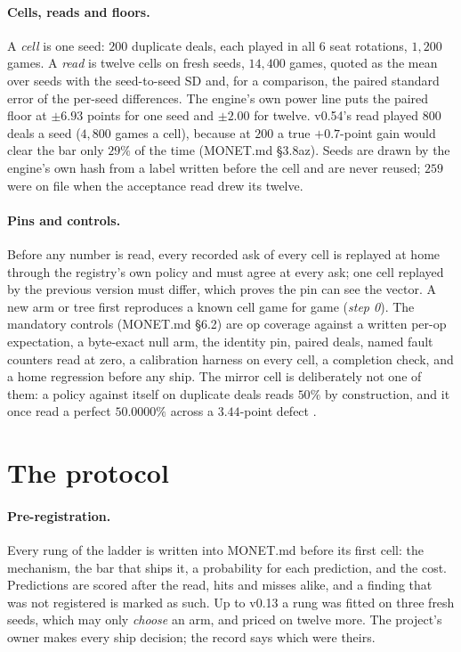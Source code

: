 \documentclass[11pt]{article}
\newcommand{\monet}{MONET.md}
\newcommand{\sect}[1]{\S#1}
\begin{document}
\paragraph{Cells, reads and floors.} A \emph{cell} is one seed: $200$ duplicate deals, each played in
all $6$ seat rotations, $1{,}200$ games. A \emph{read} is twelve cells on fresh seeds, $14{,}400$ games,
quoted as the mean over seeds with the seed-to-seed SD and, for a comparison, the paired standard error
of the per-seed differences. The engine's own power line puts the paired floor at $\pm 6.93$ points for
one seed and $\pm 2.00$ for twelve. v0.54's read played $800$ deals a seed ($4{,}800$ games a cell),
because at $200$ a true $+0.7$-point gain would clear the bar only $29\%$ of the time (\monet{}
\sect{3.8az}). Seeds are drawn by the engine's own hash from a label written before the cell and are
never reused; $259$ were on file when the acceptance read drew its twelve.

\paragraph{Pins and controls.} Before any number is read, every recorded ask of every cell is replayed
at home through the registry's own policy and must agree at every ask; one cell replayed by the previous
version must differ, which proves the pin can see the vector. A new arm or tree first reproduces a known
cell game for game (\emph{step 0}). The mandatory controls (\monet{} \sect{6.2}) are op coverage
against a written per-op expectation, a byte-exact null arm, the identity pin, paired deals, named
fault counters read at zero, a calibration harness on every cell, a completion check, and a home
regression before any ship. The mirror cell is deliberately not one of them: a policy against itself on
duplicate deals reads $50\%$ by construction, and it once read a perfect $50.0000\%$ across a
$3.44$-point defect \cite{frontier}.

\section{The protocol}
\label{sec:protocol}

\paragraph{Pre-registration.} Every rung of the ladder is written into \monet{} before its first cell:
the mechanism, the bar that ships it, a probability for each prediction, and the cost. Predictions are
scored after the read, hits and misses alike, and a finding that was not registered is marked as such.
Up to v0.13 a rung was fitted on three fresh seeds, which may only \emph{choose} an arm, and priced on
twelve more. The project's owner makes every ship decision; the record says which were theirs.
\end{document}
